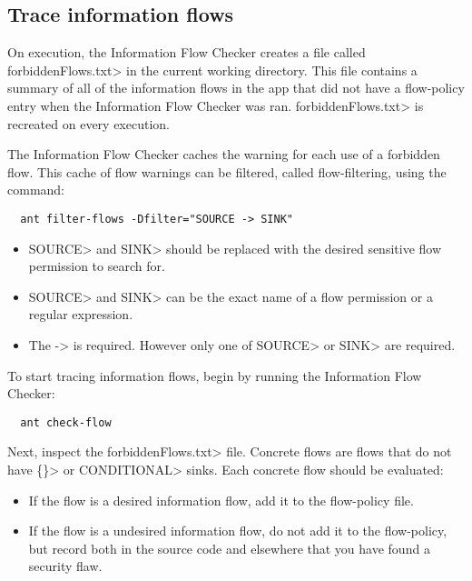 \subsection{Trace information flows\label{sec:trace-types}}

On execution, the Information Flow Checker creates a file called \<forbiddenFlows.txt> in the current
working directory. This file contains a summary of all of the information flows
in the app that did not have a flow-policy entry when the Information Flow Checker was ran.
\<forbiddenFlows.txt> is recreated on every execution.

The Information Flow Checker caches the warning for each use of a forbidden flow.
This cache of flow warnings can be filtered, called flow-filtering, using the command:

\begin{Verbatim}
  ant filter-flows -Dfilter="SOURCE -> SINK"
\end{Verbatim}

\begin{itemize}

\item \<SOURCE> and \<SINK> should be replaced with the desired sensitive flow
permission to search for.

\item \<SOURCE> and \<SINK> can be the exact name of a flow permission or a regular
expression.

\item The -> is required. However only one of \<SOURCE> or \<SINK> are required.
\end{itemize}

To start tracing information flows, begin by running the Information Flow Checker:

\begin{Verbatim}
  ant check-flow
\end{Verbatim}

Next, inspect the \<forbiddenFlows.txt> file. Concrete flows are flows that do not have
\<\{\}> or \<CONDITIONAL> sinks. Each concrete flow should be evaluated:

\begin{itemize}
\item
If the flow is a desired information flow, add it to the flow-policy file.
\item
If the flow is a undesired information flow, do not add it to the flow-policy,
but record both in the source code and elsewhere that you have found a security flaw.
\end{itemize}

